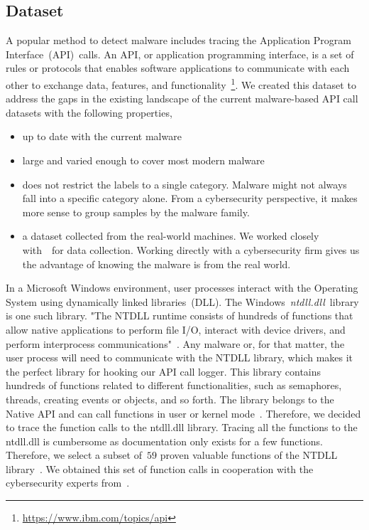 \subsection{Dataset}
\label{subsec:dataset}
A popular method to detect malware includes tracing the Application Program Interface~(API)~calls.
An API, or application programming interface, is a set of rules or protocols that enables software applications to communicate with each other to exchange data, features, and functionality~\footnote{\url{https://www.ibm.com/topics/api}}.
We created this dataset to address the gaps in the existing landscape of the current malware-based API call datasets with the following properties,
\begin{itemize}
    \item up to date with the current malware
    \item large and varied enough to cover most modern malware
    \item does not restrict the labels to a single category. Malware might not always fall into a specific category alone. From a cybersecurity perspective, it makes more sense to group samples by the malware family.
    \item a dataset collected from the real-world machines. We worked closely with~\gdata~for data collection. 
    Working directly with a cybersecurity firm gives us the advantage of knowing the malware is from the real world.
\end{itemize}

In a Microsoft Windows environment, user processes interact with the Operating System using dynamically linked libraries~(DLL). 
The Windows~\emph{ntdll.dll}~library is one such library.
"The NTDLL runtime consists of hundreds of functions that allow native applications to perform file I/O, interact with device drivers, and perform interprocess communications"~\cite{ms_ntdll}. 
Any malware or, for that matter, the user process will need to communicate with the NTDLL library, which makes it the perfect library for hooking our API call logger.
This library contains hundreds of functions related to different functionalities, such as semaphores, threads, creating events or objects, and so forth.
The library belongs to the Native API and can call functions in user or kernel mode~\cite{chappell2024}.
Therefore, we decided to trace the function calls to the ntdll.dll library.
Tracing all the functions to the ntdll.dll is cumbersome as documentation only exists for a few functions.
Therefore, we select a subset of~$59$ proven valuable functions of the NTDLL library~\cite{inside_ntdll}.
We obtained this set of function calls in cooperation with the cybersecurity experts from~\gdata.%

